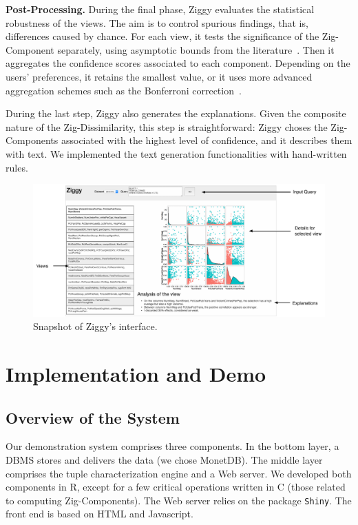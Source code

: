 \vfill
\textbf{Post-Processing.} During the final phase, Ziggy evaluates the
statistical robustness of the views. The aim is to control spurious findings,
that is, differences caused by chance. For each view, it tests the
significance of the Zig-Component separately, using asymptotic bounds from the
literature~\cite{hedges2014statistical}. Then it aggregates the confidence
scores associated to each component. Depending on the users' preferences, it
retains the smallest value, or it uses more advanced aggregation schemes such
as the Bonferroni correction~\cite{wasserman2013all}. 

During the last step, Ziggy also generates the explanations. Given the
composite nature of the Zig-Dissimilarity, this step is straightforward: Ziggy
choses the Zig-Components associated with the highest level of confidence, and
it describes them with text. We implemented the text generation functionalities
with hand-written rules.
\begin{figure}[!th]
    \centering
    \includegraphics[width=.95\textwidth]{Images/ScreenDetail}
    \caption{Snapshot of Ziggy's interface.}
    \label{fig:screenshot}
\end{figure}
\pagebreak


\section{Implementation and Demo}
\label{sec:demo}

\subsection{Overview of the System}
\label{sec:archi}
Our demonstration system comprises three components. In the bottom layer, a
DBMS stores and delivers the data (we chose MonetDB). The middle layer
comprises the tuple characterization engine and a Web server. We developed both
components in R, except for a few critical operations written in C (those
related to computing Zig-Components). The Web server relies on the package
\texttt{Shiny}. The front end is based on HTML and Javascript. 

